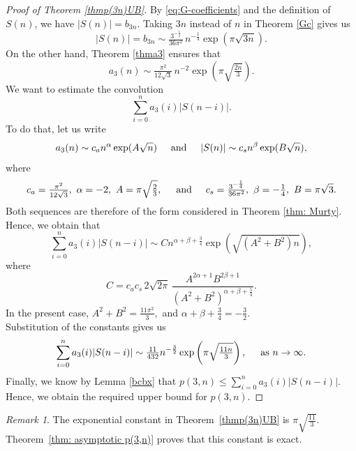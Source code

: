 \documentclass[12pt,a4paper]{amsart}
\numberwithin{equation}{section}
\theoremstyle{plain}
\theoremstyle{definition}
\theoremstyle{remark}
\newtheorem{re}[thm]{Remark}
\begin{document}
\begin{proof}[Proof of Theorem \ref{thmp(3n)UB}]
By \eqref{eq:G-coefficients} and the definition of $S(n)$, we have $|S(n)|=b_{3n}$.
Taking $3n$ instead of $n$ in Theorem \ref{Gc} gives us
$$
|S(n)|=b_{3n}
\sim
\tfrac{3^{-\frac{1}{4}}}{36\pi^2}\,
n^{-\frac{1}{4}}\exp\left(\pi\sqrt{3n}\right).
$$
On the other hand, Theorem \ref{thma3} ensures that
$$
a_3(n)
\sim
\tfrac{\pi^2}{12\sqrt3}\,
n^{-2}\exp\left(\pi\sqrt{\tfrac{2n}{3}}\right).
$$
We want to estimate the convolution
$$\sum_{i=0}^na_3(i)|S(n-i)|.$$
To do that, let us write
\begin{align*}
    a_3(n)\sim c_a n^\alpha\exp(A\sqrt n)\hspace{0.5cm}\text{and}\hspace{0.5cm}|S(n)|\sim c_s n^\beta\exp(B\sqrt n),
\end{align*}
where
\begin{align*}
    c_a=\tfrac{\pi^2}{12\sqrt3},\
\alpha=-2,\
A=\pi\sqrt{\tfrac{2}{3}},\hspace{0.5cm}\text{and}\hspace{0.5cm}c_s=\tfrac{3^{-\frac{1}{4}}}{36\pi^2},\
\beta=-\tfrac14,\
B=\pi\sqrt3.
\end{align*}
Both sequences are therefore of the form considered in Theorem \ref{thm: Murty}. Hence, we obtain that
$$
\sum_{i=0}^{n}a_3(i)|S(n-i)|\sim C n^{\alpha+\beta+\frac{3}{4}}\exp\left(\sqrt{(A^2+B^2)n}\right),
$$
where
$$
C=c_ac_s\,2\sqrt{2\pi}\,\frac{A^{2\alpha+1}B^{2\beta+1}}{(A^2+B^2)^{\alpha+\beta+\frac{5}{4}}}.
$$
In the present case,
$A^2+B^2=\frac{11\pi^2}{3},
$
and
$\alpha+\beta+\frac34=-\frac32$.\\
Substitution of the constants gives us 
\begin{equation}\label{eq:p3-convolution-asymptotic}
\sum_{i=0}^{n}a_3(i)|S(n-i)|
\sim\tfrac{11}{432}n^{-\frac{3}{2}}\exp\left(\pi\sqrt{\tfrac{11n}{3}} \right),\hspace{0.5cm}\text{as }n\to\infty.
\end{equation}
Finally, we know by Lemma \ref{bcbx} that $p(3,n)\le \sum_{i=0}^{n}a_3(i)|S(n-i)|$. Hence, we obtain the required upper bound for $p(3,n)$.
\end{proof}


\begin{re}
The exponential constant in Theorem~\ref{thmp(3n)UB} is $\pi\sqrt{\tfrac{11}{3}}$. Theorem~\ref{thm: asymptotic p(3,n)} proves that this constant is exact. 
\end{re}
\end{document}
